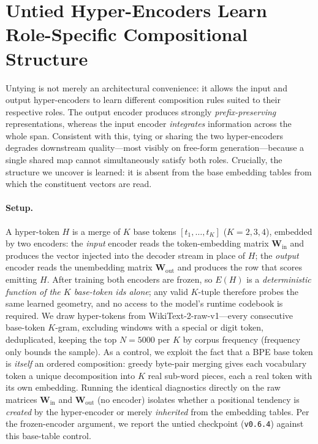 
\section{Untied Hyper-Encoders Learn Role-Specific Compositional Structure}
\label{sec:untied hyper-encoders}

Untying is not merely an architectural convenience: it allows the input and
output hyper-encoders to learn different composition rules suited to their
respective roles. The output encoder produces strongly \emph{prefix-preserving}
representations, whereas the input encoder \emph{integrates} information across
the whole span. Consistent with this, tying or sharing the two hyper-encoders
degrades downstream quality---most visibly on free-form generation---because a
single shared map cannot simultaneously satisfy both roles. Crucially, the
structure we uncover is learned: it is absent from the base embedding tables from
which the constituent vectors are read.

\paragraph{Setup.}
A hyper-token $H$ is a merge of $K$ base tokens $[t_1,\dots,t_K]$
($K\!=\!2,3,4$), embedded by two encoders: the \emph{input} encoder reads the
token-embedding matrix $\mathbf{W}_{\text{in}}$ and produces the vector injected
into the decoder stream in place of $H$; the \emph{output} encoder reads the
unembedding matrix $\mathbf{W}_{\text{out}}$ and produces the row that scores
emitting $H$. After training both encoders are frozen, so $E(H)$ is a
\emph{deterministic function of the $K$ base-token ids alone}; any valid
$K$-tuple therefore probes the same learned geometry, and no access to the
model's runtime codebook is required. We draw hyper-tokens from
WikiText-2-raw-v1---every consecutive base-token $K$-gram, excluding windows with
a special or digit token, deduplicated, keeping the top $N\!=\!5000$ per $K$ by
corpus frequency (frequency only bounds the sample). As a control, we exploit the
fact that a BPE base token is \emph{itself} an ordered composition: greedy
byte-pair merging gives each vocabulary token a unique decomposition into $K$
real sub-word pieces, each a real token with its own embedding. Running the
identical diagnostics directly on the raw matrices $\mathbf{W}_{\text{in}}$ and
$\mathbf{W}_{\text{out}}$ (no encoder) isolates whether a positional tendency is
\emph{created} by the hyper-encoder or merely \emph{inherited} from the embedding
tables. Per the frozen-encoder argument, we report the untied checkpoint
(\texttt{v0.6.4}) against this base-table control.

